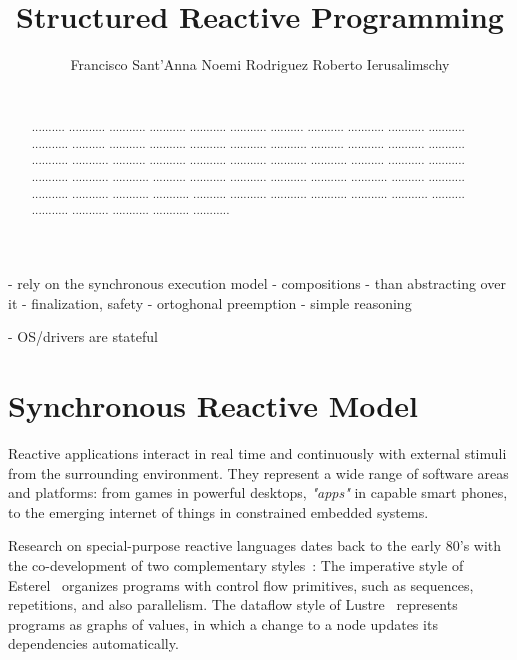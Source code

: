 \documentclass{acm_proc_article-sp}
\newcommand{\1}{\;}
\newcommand{\2}{\;\;}
\newcommand{\3}{\;\;\;}
\newcommand{\5}{\;\;\;\;\;}
\begin{document}
\title {
    Structured Reactive Programming
}

- rely on the synchronous execution model
- compositions
- than abstracting over it
- finalization, safety
- ortoghonal preemption
- simple reasoning

- OS/drivers are stateful

\author{
    \alignauthor
    Francisco Sant'Anna \hspace{1cm} Noemi Rodriguez \hspace{1cm} Roberto Ierusalimschy   \\
     \\
}

\maketitle

\begin{abstract}
.......... ........... ........... ........... ........... ...........
.......... ........... ........... ........... ........... ...........
.......... ........... ........... ........... ........... ...........
.......... ........... ........... ........... ........... ...........
.......... ........... ........... ........... ........... ...........
.......... ........... ........... ........... ........... ...........
.......... ........... ........... ........... ........... ...........
.......... ........... ........... ........... ........... ...........
.......... ........... ........... ........... ........... ...........
.......... ........... ........... ........... ........... ...........
\end{abstract}

\section{Synchronous Reactive Model}
\label{sec.overview}
Reactive applications interact in real time and continuously with external 
stimuli from the surrounding environment.
They represent a wide range of software areas and platforms: from games in 
powerful desktops, \emph{"apps"} in capable smart phones, to the emerging 
internet of things in constrained embedded systems.

Research on special-purpose reactive languages dates back to the early 80's 
with the co-development of two complementary styles~\cite{rp.twelve}:
%
The imperative style of Esterel~\cite{TODO} organizes programs with control 
flow primitives, such as sequences, repetitions, and also parallelism.
%
The dataflow style of Lustre~\cite{TODO} represents programs as graphs of 
values, in which a change to a node updates its dependencies automatically.
\end{document}
